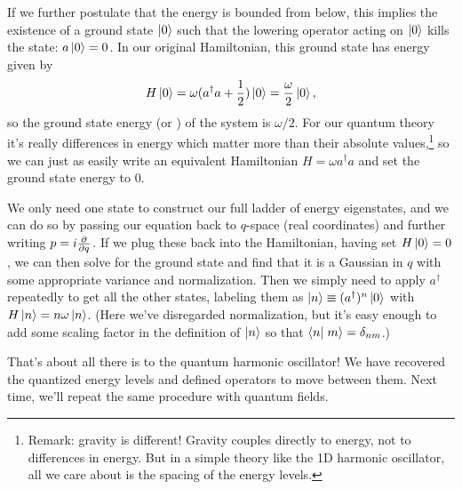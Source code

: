 If we further postulate that the energy is bounded from below, this implies the existence of a ground state $\ket{0}$ such that the lowering operator acting on $\ket{0}$ kills the state: $a\ket{0}= 0$. In our original Hamiltonian, this ground state has energy given by
$$H \ket{0}=\omega (a^\dagger a +\frac{1}{2})\ket{0} = \frac{\omega}{2}\ket{0},$$ so the ground state energy (or ) of the system is $\omega/2$. For our quantum theory it's really differences in energy which matter more than their absolute values,\footnote{Remark: gravity is different! Gravity couples directly to energy, not to differences in energy. But in a simple theory like the 1D harmonic oscillator, all we care about is the spacing of the energy levels.} so we can just as easily write an equivalent Hamiltonian $H=\omega a^\dagger a$ and set the ground state energy to $0$.

We only need one state to construct our full ladder of energy eigenstates, and we can do so by passing our equation back to $q$-space (real coordinates) and further writing $p=i \P{}{q}$. If we plug these back into the Hamiltonian, having set $H\ket{0}=0$, we can then solve for the ground state and find that it is a Gaussian in $q$ with some appropriate variance and normalization. Then we simply need to apply $a^\dagger$ repeatedly to get all the other states, labeling them as $\ket{n}\equiv(a^\dagger)^n \ket{0}$ with $H \ket{n}=n\omega \ket{n}$. (Here we've disregarded normalization, but it's easy enough to add some scaling factor in the definition of $\ket{n}$ so that $\braket{n}{m}=\delta_{nm}$.)

That's about all there is to the quantum harmonic oscillator! We have recovered the quantized energy levels and defined operators to move between them. Next time, we'll repeat the same procedure with quantum fields.